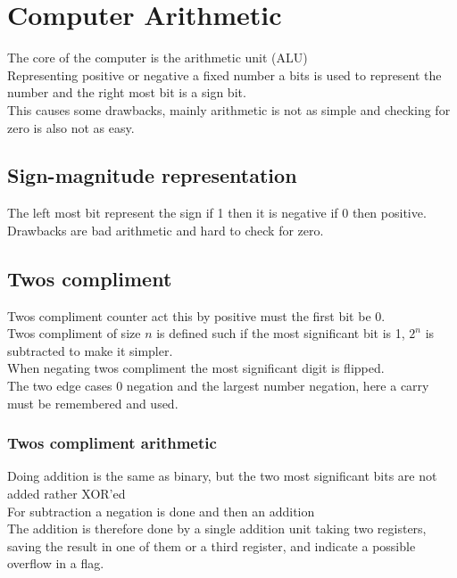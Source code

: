 \documentclass[12pt, a4paper]{article}
\begin{document}
	\section{Computer Arithmetic}
		The core of the computer is the arithmetic unit (ALU)\\
		Representing positive or negative a fixed number a bits is used to represent the number and the right most bit is a sign bit.\\
		This causes some drawbacks, mainly arithmetic is not as simple and checking for zero is also not as easy.\\
		\subsection{Sign-magnitude representation}
			The left most bit represent the sign if 1 then it is negative if 0 then positive.\\
			Drawbacks are bad arithmetic and hard to check for zero.
		\subsection{Twos compliment}
			Twos compliment counter act this by positive must the first bit be 0.\\
			Twos compliment of size $n$ is defined such if the most significant bit is 1, $2^n$ is subtracted to make it simpler.\\
			When negating twos compliment the most significant digit is flipped.\\
			The two edge cases 0 negation and the largest number negation, here a carry must be remembered and used.\\
			\subsubsection{Twos compliment arithmetic}
				Doing addition is the same as binary, but the two most significant bits are not added rather XOR'ed\\
				For subtraction a negation is done and then an addition\\
				The addition is therefore done by a single addition unit taking two registers, saving the result in one of them or a third register, and indicate a possible overflow in a flag.\\
\end{document}
